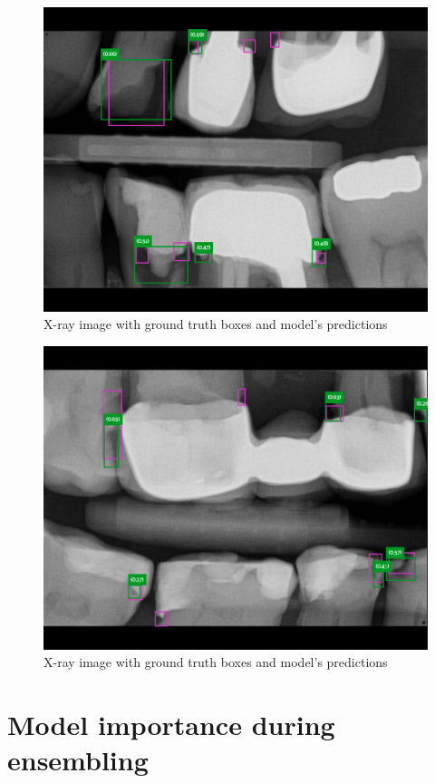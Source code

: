 \begin{figure}
    \includegraphics[width=0.9\linewidth]{images/rest1.png}
    \caption{X-ray image with ground truth boxes and model's predictions}
    \label{fig:pred_img3}
\end{figure}

\begin{figure}
    \includegraphics[width=0.9\linewidth]{images/rest2.png}
    \caption{X-ray image with ground truth boxes and model's predictions}
    \label{fig:pred_img4}
\end{figure}

\chapter{Model importance during ensembling}

